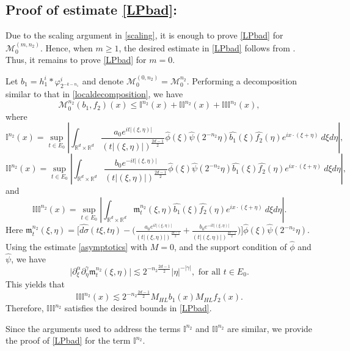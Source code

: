 \documentclass[a4paper,reqno]{amsart}
\numberwithin{equation}{section}
\newcommand{\R}{{\mathbb {R}}}
\begin{document}
	\subsection*{Proof of estimate \eqref{LPbad}:} Due to the scaling argument in \eqref{scaling}, it is enough to prove \eqref{LPbad} for $\mathcal{M}^{(m,n_2)}_{0}$. Hence, when $m\geq1$, the desired estimate in \eqref{LPbad} follows from . Thus, it remains to prove \eqref{LPbad} for $m=0$.
	
	Let $b_1=h^{i}_1\ast\varphi_{2^{-k-n_1}}^i$ and denote $\mathcal{M}^{(0,n_2)}_{0}=\mathcal{M}^{n_2}_0$. Performing a decomposition similar to that in \eqref{localdecomposition}, we have
	\[\mathcal{M}^{n_2}_0(b_1,f_2)(x)\leq \mathbb{I}^{n_2}(x)+\mathbb{II}^{n_2}(x)+\mathbb{III}^{n_2}(x),\]
	where
	\[\mathbb{I}^{n_2}(x)=\sup_{t\in E_0}\left|\int_{\R^d\times\R^d}\frac{a_0 e^{it|(\xi,\eta)|}}{(t|(\xi,\eta)|)^{\frac{2d-1}{2}}}\widehat{\phi}\left( \xi\right)\widehat{\psi}\left(2^{-n_2} \eta\right)\widehat{b_1}(\xi)\widehat{f_2}(\eta)e^{ix\cdot(\xi+\eta)}~d\xi d\eta\right|,\]
	\[\mathbb{II}^{n_2}(x)=\sup_{t\in E_0}\left|\int_{\R^d\times\R^d}\frac{b_0 e^{-it|(\xi,\eta)|}}{(t|(\xi,\eta)|)^{\frac{2d-1}{2}}}\widehat{\phi}\left( \xi\right)\widehat{\psi}\left(2^{-n_2} \eta\right)\widehat{b_1}(\xi)\widehat{f_2}(\eta)e^{ix\cdot(\xi+\eta)}~d\xi d\eta\right|,\]
	and
	\[\mathbb{III}^{n_2}(x)=\sup_{t\in E_0}\left|\int_{\R^d\times\R^d}\mathfrak{m}_{t}^{n_2}(\xi,\eta)\widehat{b_1}(\xi)\widehat{f_2}(\eta)e^{ix\cdot(\xi+\eta)}~d\xi d\eta\right|.\]
	Here $\mathfrak{m}_{t}^{n_2}(\xi,\eta)=\Big[\widehat{d\sigma}(t\xi,t\eta)-\Big(\frac{a_0 e^{it|(\xi,\eta)|}}{(t|(\xi,\eta)|)^{\frac{2d-1}{2}}}+\frac{b_0 e^{-it|(\xi,\eta)|}}{(t|(\xi,\eta)|)^{\frac{2d-1}{2}}}\Big)\Big]\widehat{\phi}\left(\xi\right)\widehat{\psi}\left(2^{-n_2} \eta\right)$. Using the estimate \eqref{asymptotics} with $M=0$, and the support condition of $\widehat{\phi}$ and $\widehat{\psi}$, we have
	\[\big|\partial^{\alpha}_{\xi}\partial^{\gamma}_{\eta}\mathfrak{m}_{t}^{n_2}(\xi,\eta)\big|\lesssim2^{-n_2\frac{2d-1}{2}}|\eta|^{-|\gamma|}, \text{ for all }t\in E_0.\]
	This yields that 
	\begin{equation*}\label{error2}
		\mathbb{III}^{n_2}(x)\lesssim 2^{-n_2\frac{2d-1}{2}}M_{HL}b_1(x)M_{HL}f_2(x).
	\end{equation*}
	Therefore, $\mathbb{III}^{n_2}$ satisfies the desired bounds in \eqref{LPbad}. 
	
	Since the arguments used to address the terms $\mathbb{I}^{n_2}$ and $\mathbb{II}^{n_2}$ are similar, we provide the proof of \eqref{LPbad} for the term $\mathbb{I}^{n_2}$.
	
\end{document}
